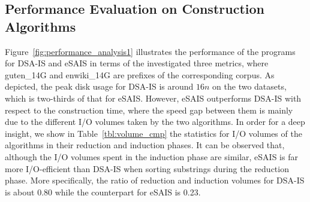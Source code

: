 \documentclass[10pt,journal,compsoc]{IEEEtran}
\begin{document}
\subsection{Performance Evaluation on Construction Algorithms}
Figure~\ref{fig:performance_analysis1} illustrates the performance of the programs for DSA-IS and eSAIS in terms of the investigated three metrics, where guten\_14G and enwiki\_14G are prefixes of the corresponding corpus. As depicted, the peak disk usage for DSA-IS is around $16n$ on the two datasets, which is two-thirds of that for eSAIS. However, eSAIS outperforms DSA-IS with respect to the construction time, where the speed gap between them is mainly due to the different I/O volumes taken by the two algorithms. In order for a deep insight, we show in Table~\ref{tbl:volume_cmp} the statistics for I/O volumes of the algorithms in their reduction and induction phases. It can be observed that, although the I/O volumes spent in the induction phase are similar, eSAIS is far more I/O-efficient than DSA-IS when sorting substrings during the reduction phase. More specifically, the ratio of reduction and induction volumes for DSA-IS is about 0.80 while the counterpart for eSAIS is 0.23.
\end{document}
